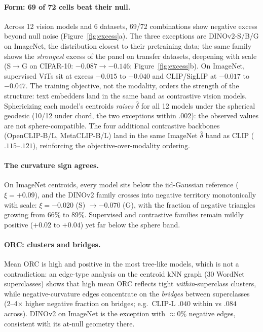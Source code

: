 \documentclass{article} %
\begin{document}
\paragraph{Form: 69 of 72 cells beat their null.} Across 12 vision models and 6 datasets, 69/72 combinations show negative excess beyond null noise (Figure~\ref{fig:excess}a). The three exceptions are DINOv2-S/B/G on ImageNet, the distribution closest to their pretraining data; the same family shows the \emph{strongest} excess of the panel on transfer datasets, deepening with scale (S$\to$G on CIFAR-10: $-0.087 \to -0.146$; Figure~\ref{fig:excess}b). On ImageNet, supervised ViTs sit at excess $-0.015$ to $-0.040$ and CLIP/SigLIP at $-0.017$ to $-0.047$. The training objective, not the modality, orders the strength of the structure: text embedders land in the same band as contrastive vision models. %
Sphericizing each model's centroids \emph{raises} $\hat\delta$ for all 12 models under the spherical geodesic (10/12 under chord, the two exceptions within $.002$): the observed values are not sphere-compatible. %
The four additional contrastive backbones (OpenCLIP-B/L, MetaCLIP-B/L) land in the same ImageNet $\hat\delta$ band as CLIP ($.115$--$.121$), reinforcing the objective-over-modality ordering. %

\paragraph{The curvature sign agrees.} On ImageNet centroids, every model sits below the iid-Gaussian reference ($\xi = +0.09$), and the DINOv2 family crosses into negative territory monotonically with scale: $\xi = -0.020$ (S) $\to -0.070$ (G), with the fraction of negative triangles growing from 66\% to 89\%. Supervised and contrastive families remain mildly positive ($+0.02$ to $+0.04$) yet far below the sphere band. %

\paragraph{ORC: clusters and bridges.} Mean ORC is high and positive in the most tree-like models, which is not a contradiction: an edge-type analysis on the centroid kNN graph (30 WordNet superclasses) shows that high mean ORC reflects tight \emph{within}-superclass clusters, while negative-curvature edges concentrate on the \emph{bridges} between superclasses (2--4$\times$ higher negative fraction on bridges; e.g.\ CLIP-L $.040$ within vs $.084$ across). DINOv2 on ImageNet is the exception with $\approx 0\%$ negative edges, consistent with its at-null geometry there. %
\end{document}
